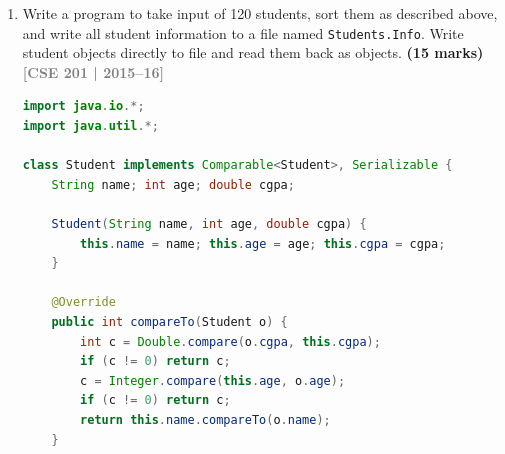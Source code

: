 \documentclass[12pt,a3paper]{article}
\newcommand{\yr}[1]{\hfill\textcolor{gray}{\small\textbf{[#1]}}}
\newcommand{\mk}[1]{\textcolor{orange!70!black}{\small\textbf{(#1 marks)}}}
\begin{document}
\begin{enumerate}
\begin{tcolorbox}[enhanced,breakable,ansbox,
  colback=cC!4,colframe=cC,boxrule=0.8pt,arc=5pt,
  title={\textbf{Answer --- Student Collection with Custom Sort}},
  fonttitle=\bfseries\color{white},colbacktitle=cC]
\begin{lstlisting}[language=Java]
    @Override
    public String toString() {
        return name + " (age=" + age + ", cgpa=" + cgpa + ")";
    }
}

class StudentSort {
    public static void main(String[] args) {
        List<Student> list = new ArrayList<>();
        list.add(new Student("Alice", 21, 3.8));
        list.add(new Student("Bob",   20, 3.9));
        list.add(new Student("Carol", 22, 3.8));
        list.add(new Student("Dave",  21, 3.8));
        list.add(new Student("Eve",   19, 4.0));

        Collections.sort(list);

        System.out.println("Sorted students:");
        for (Student s : list)
            System.out.println("  " + s);
    }
}
\end{lstlisting}
\textbf{Output:}
\begin{verbatim}
Sorted students:
  Eve (age=19, cgpa=4.0)
  Bob (age=20, cgpa=3.9)
  Alice (age=21, cgpa=3.8)
  Dave (age=21, cgpa=3.8)
  Carol (age=22, cgpa=3.8)
\end{verbatim}
\end{tcolorbox}

\item Write a program to take input of 120 students, sort them as described above, and write all student information to a file named \texttt{Students.Info}. Write student objects directly to file and read them back as objects. \mk{15}
\yr{CSE 201 | 2015--16}

\begin{tcolorbox}[enhanced,breakable,ansbox,
  colback=cC!4,colframe=cC,boxrule=0.8pt,arc=5pt,
  title={\textbf{Answer --- 120 Students: Sort, Serialize to File and Read Back}},
  fonttitle=\bfseries\color{white},colbacktitle=cC]
\begin{lstlisting}[language=Java]
import java.io.*;
import java.util.*;

class Student implements Comparable<Student>, Serializable {
    String name; int age; double cgpa;

    Student(String name, int age, double cgpa) {
        this.name = name; this.age = age; this.cgpa = cgpa;
    }

    @Override
    public int compareTo(Student o) {
        int c = Double.compare(o.cgpa, this.cgpa);
        if (c != 0) return c;
        c = Integer.compare(this.age, o.age);
        if (c != 0) return c;
        return this.name.compareTo(o.name);
    }


\end{lstlisting}
\end{tcolorbox}
\end{enumerate}
\end{document}
